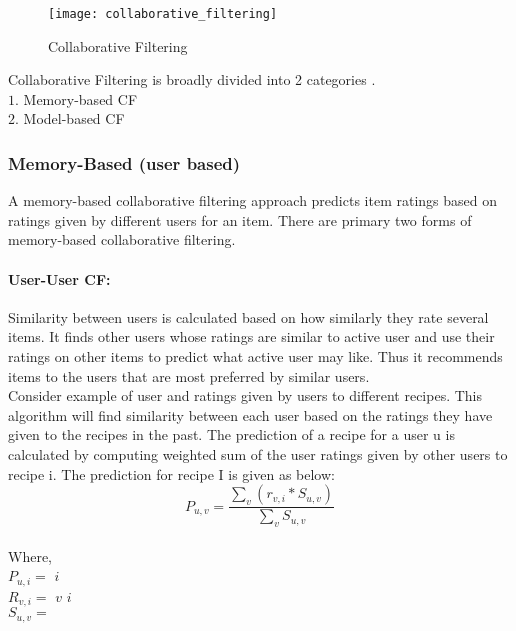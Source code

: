 \begin{figure}[H]
	\centering
	\texttt{[image: collaborative\_filtering]}
	\caption{Collaborative Filtering \cite{8}}
	\label{fig:collaborative_filtering}
\end{figure}


Collaborative Filtering is broadly divided into 2 categories \cite{11}. 
\\
$1.$ Memory-based CF
\\
$2.$ Model-based CF
\\
\subsubsection{Memory-Based (user based)}
A memory-based collaborative filtering approach predicts item ratings based on ratings given by different users for an item. There are primary two forms of memory-based collaborative filtering.
\paragraph{User-User CF:} 

Similarity between users is calculated based on how similarly they rate several items. It finds other users whose ratings are similar to active user and use their ratings on other items to predict what active user may like. Thus it recommends items to the users that are most preferred by similar users.
\\
Consider example of user and ratings given by users to different recipes. This algorithm will find similarity between each user based on the ratings they have given to the recipes in the past. The prediction of a recipe for a user u is calculated by computing weighted sum of the user ratings given by other users to recipe i.
The prediction for recipe I is given as below:
\\
\begin{equation}
P_{u,v} = \frac { \sum_v(r_{v,i} * S_{u,v})}{\sum_v S_{u,v}}
\end{equation}
\\
Where, 
\\
\noindent
$P_{u,i} = $  $i$ 
\\
$R_{v,i} = $  $v$  $i$ 
\\
$S_{u,v} = $ 
\\

